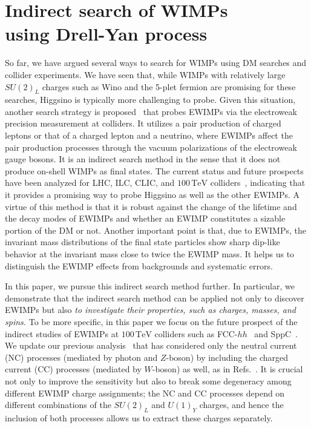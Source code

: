 \documentclass[12pt,twoside,book]{article}
\begin{document}
\section[Indirect search of WIMPs using Drell-Yan process]{
  Indirect search of WIMPs\\
  using Drell-Yan process
}
\setcounter{equation}{0}

So far, we have argued several ways to search for WIMPs using DM searches and collider experiments.
We have seen that, while WIMPs with relatively large $SU(2)_L$ charges such as Wino and the 5-plet fermion are promising for these searches, Higgsino is typically more challenging to probe.
Given this situation, another search strategy is proposed~\cite{Alves:2014cda, Gross:2016ioi,
Farina:2016rws,Harigaya:2015yaa, Matsumoto:2017vfu, Chigusa:2018vxz,
DiLuzio:2018jwd, Matsumoto:2018ioi} that probes EWIMPs via the
electroweak precision measurement at colliders.
It utilizes a pair production of charged leptons or that of a charged lepton and a neutrino, where EWIMPs affect the pair production processes through the vacuum polarizations of the electroweak gauge bosons.
It is an indirect search method in the sense that it does not produce on-shell WIMPs as final states. The current status and future prospects have been analyzed for LHC, ILC, CLIC, and $100\,\mathrm{TeV}$ colliders~\cite{Mangano:2016jyj, Contino:2016spe, Golling:2016gvc}, indicating that it provides a promising way to probe Higgsino as well as the other EWIMPs.
A virtue of this method is that it is robust against the change of the lifetime and the decay modes of EWIMPs and whether an EWIMP constitutes a sizable portion of the DM or not.
Another important point is that, due to EWIMPs, the invariant mass distributions of the final state particles show sharp dip-like behavior at the invariant mass close to twice the EWIMP mass.
It helps us to distinguish the EWIMP effects from backgrounds and systematic errors.

In this paper, we pursue this indirect search method further.  In particular, we demonstrate that the indirect search method can be applied not only to discover EWIMPs but also \textit{to investigate their properties, such as charges, masses, and spins.}
To be more specific, in this paper we focus on the future prospect of the indirect studies of EWIMPs at $100\,\mathrm{TeV}$ colliders such as FCC-$hh$~\cite{Benedikt:2651300} and SppC~\cite{CEPC-SPPCStudyGroup:2015csa, CEPC-SPPCStudyGroup:2015esa}.
We update our previous analysis~\cite{Chigusa:2018vxz} that has considered only the neutral current (NC) processes (mediated by photon and $Z$-boson) by including the charged current (CC)
processes (mediated by $W$-boson) as well, as in
Refs.~\cite{DiLuzio:2018jwd, Matsumoto:2018ioi}.
It is crucial not only to improve the sensitivity but also to break some degeneracy among different EWIMP charge assignments; the NC and CC processes depend on different combinations of the $SU(2)_L$ and $U(1)_Y$ charges, and hence the inclusion of both processes allows us to extract these charges separately.
\end{document}
